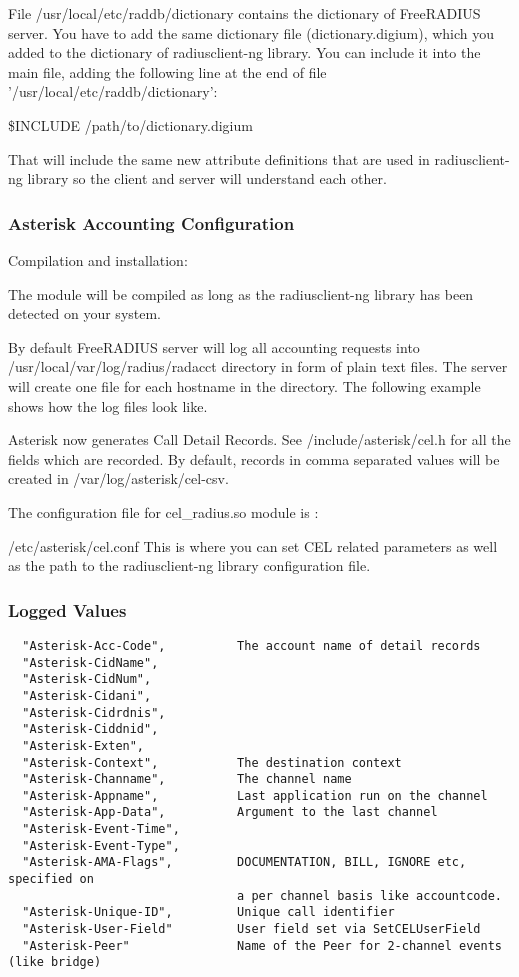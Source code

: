	File /usr/local/etc/raddb/dictionary contains the dictionary of 
	FreeRADIUS server. You have to add the same dictionary file 
	(dictionary.digium), which you added to the dictionary of radiusclient-ng
	library. You can include it into the main file, adding the following line at the
	end of file '/usr/local/etc/raddb/dictionary':

	\$INCLUDE /path/to/dictionary.digium

	That will include the same new attribute definitions that are used 
	in radiusclient-ng library so the client and server will understand each 
	other. 


\subsubsection{Asterisk Accounting Configuration}

	Compilation and installation:

        The module will be compiled as long as the radiusclient-ng
        library has been detected on your system.

	By default FreeRADIUS server will log all accounting requests into 
	/usr/local/var/log/radius/radacct directory in form of plain text files. 
	The server will create one file for each hostname in the directory. The 
	following example shows how the log files look like. 

	Asterisk now generates Call Detail Records. See /include/asterisk/cel.h
	for all the fields which are recorded. By default, records in comma 
	separated values will be created in /var/log/asterisk/cel-csv. 

	The configuration file for cel_radius.so module is :

        /etc/asterisk/cel.conf 
	This is where you can set CEL related parameters as well as the path to
	the radiusclient-ng library configuration file.


\subsubsection{Logged Values}
\begin{verbatim}
  "Asterisk-Acc-Code",          The account name of detail records
  "Asterisk-CidName",
  "Asterisk-CidNum",
  "Asterisk-Cidani",
  "Asterisk-Cidrdnis",
  "Asterisk-Ciddnid",
  "Asterisk-Exten",
  "Asterisk-Context",           The destination context
  "Asterisk-Channame",          The channel name
  "Asterisk-Appname",	        Last application run on the channel 
  "Asterisk-App-Data",          Argument to the last channel 
  "Asterisk-Event-Time",        
  "Asterisk-Event-Type",        
  "Asterisk-AMA-Flags",       	DOCUMENTATION, BILL, IGNORE etc, specified on 
                                a per channel basis like accountcode. 
  "Asterisk-Unique-ID",         Unique call identifier 
  "Asterisk-User-Field"	        User field set via SetCELUserField 
  "Asterisk-Peer"	            Name of the Peer for 2-channel events (like bridge)
  
\end{verbatim}
